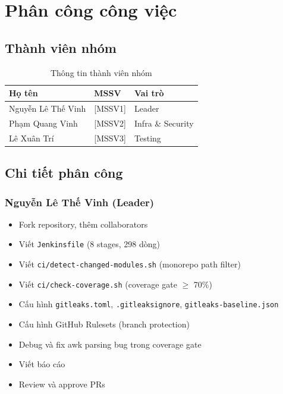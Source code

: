\section{Phân công công việc}

\subsection{Thành viên nhóm}
\begin{table}[H]
\centering
\caption{Thông tin thành viên nhóm}
\begin{tabular}{|l|l|l|}
\hline
\textbf{Họ tên} & \textbf{MSSV} & \textbf{Vai trò} \\
\hline
Nguyễn Lê Thế Vinh & [MSSV1] & Leader \\
\hline
Phạm Quang Vinh & [MSSV2] & Infra \& Security \\
\hline
Lê Xuân Trí & [MSSV3] & Testing \\
\hline
\end{tabular}
\end{table}

\subsection{Chi tiết phân công}

\subsubsection{Nguyễn Lê Thế Vinh (Leader)}
\begin{itemize}[noitemsep]
    \item Fork repository, thêm collaborators
    \item Viết \texttt{Jenkinsfile} (8 stages, 298 dòng)
    \item Viết \texttt{ci/detect-changed-modules.sh} (monorepo path filter)
    \item Viết \texttt{ci/check-coverage.sh} (coverage gate $\geq$ 70\%)
    \item Cấu hình \texttt{gitleaks.toml}, \texttt{.gitleaksignore}, \texttt{gitleaks-baseline.json}
    \item Cấu hình GitHub Rulesets (branch protection)
    \item Debug và fix awk parsing bug trong coverage gate
    \item Viết báo cáo
    \item Review và approve PRs
\end{itemize}

